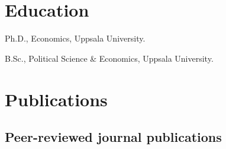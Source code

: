 \documentclass[10pt,letterpaper]{article}
\newenvironment{singledatelist}{
	\begin{list}{}{
		\setlength{\parskip}{0pt}
		\setlength{\itemsep}{4pt}
		\setlength{\parsep}{0.3em}
		\setlength{\leftmargin}{3.5em}
		\setlength{\labelwidth}{3.5em}
		\setlength{\labelsep}{1.5em}
		}
	}{
\end{list}
}
\newcommand{\dateitem}[2][]{\item[{#1}] {#2}}
\begin{document}
	\section*{Education}

	\begin{singledatelist}
		\dateitem[2015]{Ph.D., Economics, Uppsala University.}
		\dateitem[2010]{B.Sc., Political Science \& Economics, Uppsala University.}
	\end{singledatelist}


	\section*{Publications}

	\subsection*{Peer-reviewed journal publications}
\end{document}
